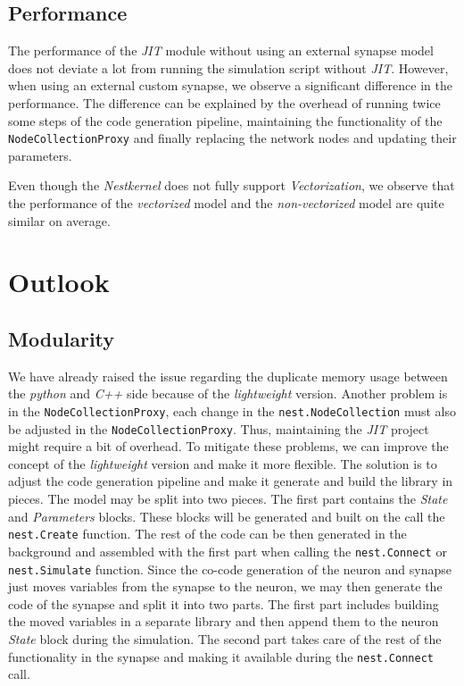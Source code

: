 \subsection*{Performance}

The performance of the \emph{JIT} module without using an external synapse model does not deviate a lot from running the simulation script without \emph{JIT}. However, when using an external custom synapse, we observe a significant difference in the performance. The difference can be explained by the overhead of running twice some steps of the code generation pipeline, maintaining the functionality of the \texttt{NodeCollectionProxy} and finally replacing the network nodes and updating their parameters.

Even though the \emph{Nestkernel} does not fully support \emph{Vectorization}, we observe that the performance of the \emph{vectorized} model and the \emph{non-vectorized} model are quite similar on average.

\section{Outlook}

\subsection*{Modularity}

We have already raised the issue regarding the duplicate memory usage between the \emph{python} and \emph{C++} side because of the \emph{lightweight} version. Another problem is in the \texttt{NodeCollectionProxy}, each change in the \texttt{nest.NodeCollection} must also be adjusted in the \texttt{NodeCollectionProxy}. Thus, maintaining the \emph{JIT} project might require a bit of overhead. To mitigate these problems, we can improve the concept of the \emph{lightweight} version and make it more flexible. The solution is to adjust the code generation pipeline and make it generate and build the library in pieces. The model may be split into two pieces. The first part contains the \emph{State} and \emph{Parameters} blocks. These blocks will be generated and built on the call the \texttt{nest.Create} function. The rest of the code can be then generated in the background and assembled with the first part when calling the \texttt{nest.Connect} or \texttt{nest.Simulate} function. Since the co-code generation of the neuron and synapse just moves variables from the synapse to the neuron, we may then generate the code of the synapse and split it into two parts. The first part includes building the moved variables in a separate library and then append them to the neuron \emph{State} block during the simulation. The second part takes care of the rest of the functionality in the synapse and making it available during the \texttt{nest.Connect} call.

